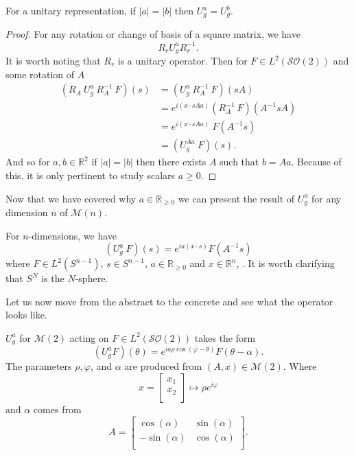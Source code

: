 \documentclass{article}
\begin{document}
\begin{theorem}
    For a unitary representation, if $| a | = | b |$ then $U^{a}_{g} = U^{b}_{g}$.
\end{theorem}
\begin{proof}
    For any rotation or change of basis of a square matrix, we have
    \[%
        R_{r} U^{a}_{g} R^{-1}_{r} 
    .\]%
    It is worth noting that $R_{r}$ is a unitary operator. Then for $F \in L^{2}(\mathcal{SO}(2))$ and some rotation of $A$
    \[%
        \begin{split}
        (R_{A} \ U^{a}_{g} \ R^{-1}_{A} \ F)(s)
        &= (U^{a}_{g} \ R^{-1}_{A} \ F)(sA)  \\
        &=  e^{i (x \cdot sAa)}  (R^{-1}_{A} \ F)(A^{-1}sA)  \\
        &= e^{i (x \cdot sAa)} \ F(A^{-1}s) \\
        &= (U^{Aa}_{g} \ F )(s).
        \end{split}
    \]%
    And so for $a,b \in \mathbb{R}^{2}$ if $| a | = | b |$ then there exists $A$ such that $b=Aa$. Because of this, it is only pertinent to study scalars $a \geq 0$.
\end{proof}

Now that we have covered why $a \in \mathbb{R}_{\geq 0}$ we can present the result of $U^{a}_{g}$ for any dimension $n$ of $\mathcal{M}(n)$.
\begin{theorem}
    For $n$-dimensions, we have
    \[%
        (U^{a}_{g} \ F)(s) = e^{i a (x \cdot s)} F(A^{-1} s)
    \]%
    where $F \in L^{2}(S^{n-1})$, $s \in S^{n-1}$, $a \in \mathbb{R}_{\geq 0}$ and $x \in \mathbb{R}^{n}$, \cite{n_dim_euclidean_iur}. It is worth clarifying that $S^{N}$ is the $N$-sphere.
    \QED
\end{theorem}

Let us now move from the abstract to the concrete and see what the operator looks like.

\begin{theorem}
    $U^{a}_{g}$ for $\mathcal{M}(2)$ acting on $F \in L^{2}(\mathcal{SO}(2))$ takes the form
    \[%
        \left(U^{a}_{g} F\right)(\theta) = e^{i a \rho \cos\left(\varphi - \theta\right)} F(\theta - \alpha) .
    \]%
    The parameters $\rho, \varphi$, and $\alpha$ are produced from $(A,x) \in \mathcal{M}(2)$. Where 
    \[%
        x = \begin{bmatrix} 
            x_1 \\
            x_2 \\		
        \end{bmatrix} 
        \mapsto
        \rho e^{i \varphi}
    \]%
    and $\alpha$ comes from
    \[%
        A = 
        \begin{bmatrix} 
            \cos\left(\alpha\right)   & \sin\left(\alpha\right) \\
            - \sin\left(\alpha\right) & \cos\left(\alpha\right) \\		
        \end{bmatrix}.
    \]%
    \cite{sugiura}
    \QED 
\end{theorem}
\end{document}
